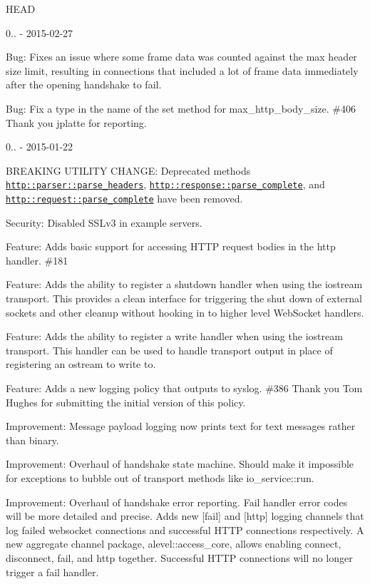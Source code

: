 H\+E\+AD

0.. -\/ 2015-\/02-\/27
\begin{DoxyItemize}
\item Bug\+: Fixes an issue where some frame data was counted against the max header size limit, resulting in connections that included a lot of frame data immediately after the opening handshake to fail.
\item Bug\+: Fix a type in the name of the set method for {\ttfamily max\+\_\+http\+\_\+body\+\_\+size}. \#406 Thank you jplatte for reporting.
\end{DoxyItemize}

0.. -\/ 2015-\/01-\/22
\begin{DoxyItemize}
\item B\+R\+E\+A\+K\+I\+NG U\+T\+I\+L\+I\+TY C\+H\+A\+N\+GE\+: Deprecated methods {\ttfamily \href{http::parser::parse_headers}{\tt http\+::parser\+::parse\+\_\+headers}}, {\ttfamily \href{http::response::parse_complete}{\tt http\+::response\+::parse\+\_\+complete}}, and {\ttfamily \href{http::request::parse_complete}{\tt http\+::request\+::parse\+\_\+complete}} have been removed.
\item Security\+: Disabled S\+S\+Lv3 in example servers.
\item Feature\+: Adds basic support for accessing H\+T\+TP request bodies in the http handler. \#181
\item Feature\+: Adds the ability to register a shutdown handler when using the iostream transport. This provides a clean interface for triggering the shut down of external sockets and other cleanup without hooking in to higher level Web\+Socket handlers.
\item Feature\+: Adds the ability to register a write handler when using the iostream transport. This handler can be used to handle transport output in place of registering an ostream to write to.
\item Feature\+: Adds a new logging policy that outputs to syslog. \#386 Thank you Tom Hughes for submitting the initial version of this policy.
\item Improvement\+: Message payload logging now prints text for text messages rather than binary.
\item Improvement\+: Overhaul of handshake state machine. Should make it impossible for exceptions to bubble out of transport methods like {\ttfamily io\+\_\+service\+::run}.
\item Improvement\+: Overhaul of handshake error reporting. Fail handler error codes will be more detailed and precise. Adds new \mbox{[}fail\mbox{]} and \mbox{[}http\mbox{]} logging channels that log failed websocket connections and successful H\+T\+TP connections respectively. A new aggregate channel package, {\ttfamily alevel\+::access\+\_\+core}, allows enabling connect, disconnect, fail, and http together. Successful H\+T\+TP connections will no longer trigger a fail handler.

\end{DoxyItemize}
